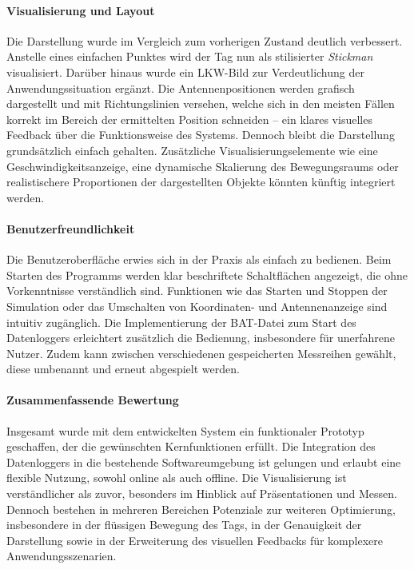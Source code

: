 \documentclass[a4paper, 12pt]{article} %
\begin{document}
\paragraph{Visualisierung und Layout}
Die Darstellung wurde im Vergleich zum vorherigen Zustand deutlich verbessert. Anstelle eines einfachen Punktes wird der Tag nun als stilisierter 
\textit{Stickman} visualisiert. Darüber hinaus wurde ein LKW-Bild zur Verdeutlichung der Anwendungssituation ergänzt. Die Antennenpositionen werden 
grafisch dargestellt und mit Richtungslinien versehen, welche sich in den meisten Fällen korrekt im Bereich der ermittelten Position schneiden – ein 
klares visuelles Feedback über die Funktionsweise des Systems. Dennoch bleibt die Darstellung grundsätzlich einfach gehalten. Zusätzliche 
Visualisierungselemente wie eine Geschwindigkeitsanzeige, eine dynamische Skalierung des Bewegungsraums oder realistischere Proportionen der 
dargestellten Objekte könnten künftig integriert werden.

\paragraph{Benutzerfreundlichkeit}
Die Benutzeroberfläche erwies sich in der Praxis als einfach zu bedienen. Beim Starten des Programms werden klar beschriftete Schaltflächen angezeigt, 
die ohne Vorkenntnisse verständlich sind. Funktionen wie das Starten und Stoppen der Simulation oder das Umschalten von Koordinaten- und Antennenanzeige 
sind intuitiv zugänglich. Die Implementierung der BAT-Datei zum Start des Datenloggers erleichtert zusätzlich die Bedienung, insbesondere für unerfahrene
 Nutzer. Zudem kann zwischen verschiedenen gespeicherten Messreihen gewählt, diese umbenannt und erneut abgespielt werden.

\paragraph{Zusammenfassende Bewertung}
Insgesamt wurde mit dem entwickelten System ein funktionaler Prototyp geschaffen, der die gewünschten Kernfunktionen erfüllt. Die Integration des 
Datenloggers in die bestehende Softwareumgebung ist gelungen und erlaubt eine flexible Nutzung, sowohl online als auch offline. Die Visualisierung 
ist verständlicher als zuvor, besonders im Hinblick auf Präsentationen und Messen. Dennoch bestehen in mehreren Bereichen Potenziale zur weiteren 
Optimierung, insbesondere in der flüssigen Bewegung des Tags, in der Genauigkeit der Darstellung sowie in der Erweiterung des visuellen Feedbacks für
 komplexere Anwendungsszenarien.
\end{document}
